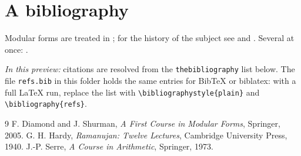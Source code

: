 \documentclass{article}
\begin{document}
\section*{A bibliography}

Modular forms are treated in \cite{diamond-shurman}; for the history of the subject see \cite{hardy}
and \cite{serre}. Several at once: \cite{serre, hardy}.

\emph{In this preview:} citations are resolved from the \texttt{thebibliography} list below. The file
\texttt{refs.bib} in this folder holds the same entries for BibTeX or biblatex: with a full LaTeX run,
replace the list with \texttt{\textbackslash bibliographystyle\{plain\}} and
\texttt{\textbackslash bibliography\{refs\}}.

\begin{thebibliography}{9}
 F. Diamond and J. Shurman, \emph{A First Course in Modular Forms}, Springer, 2005.
 G. H. Hardy, \emph{Ramanujan: Twelve Lectures}, Cambridge University Press, 1940.
 J.-P. Serre, \emph{A Course in Arithmetic}, Springer, 1973.
\end{thebibliography}
\end{document}
